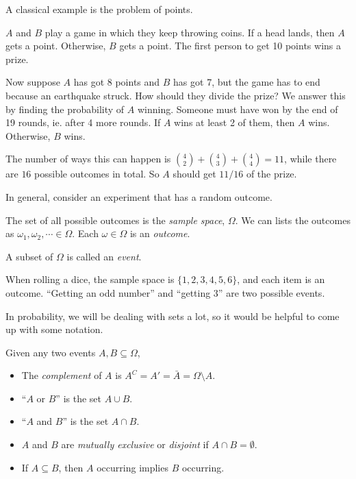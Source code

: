 \documentclass[a4paper]{article}
\begin{document}
A classical example is the problem of points.

\begin{eg}
  $A$ and $B$ play a game in which they keep throwing coins. If a head lands, then $A$ gets a point. Otherwise, $B$ gets a point. The first person to get 10 points wins a prize.

  Now suppose $A$ has got 8 points and $B$ has got 7, but the game has to end because an earthquake struck. How should they divide the prize? We answer this by finding the probability of $A$ winning. Someone must have won by the end of 19 rounds, ie. after 4 more rounds. If $A$ wins at least 2 of them, then $A$ wins. Otherwise, $B$ wins.

  The number of ways this can happen is $\binom{4}{2} + \binom{4}{3} + \binom{4}{4} = 11$, while there are $16$ possible outcomes in total. So $A$ should get $11/16$ of the prize.
\end{eg}

In general, consider an experiment that has a random outcome.

\begin{defi}
  The set of all possible outcomes is the \emph{sample space}, $\Omega$. We can lists the outcomes as $\omega_1, \omega_2, \cdots \in \Omega$. Each $\omega \in \Omega$ is an \emph{outcome}.
\end{defi}

\begin{defi}[Event]
  A subset of $\Omega$ is called an \emph{event}.
\end{defi}

\begin{eg}
  When rolling a dice, the sample space is $\{1, 2, 3, 4, 5, 6\}$, and each item is an outcome. ``Getting an odd number'' and ``getting 3'' are two possible events.
\end{eg}

In probability, we will be dealing with sets a lot, so it would be helpful to come up with some notation.
\begin{defi}
  Given any two events $A, B\subseteq \Omega$,
  \begin{itemize}
    \item The \emph{complement} of $A$ is $A^C = A' = \bar A = \Omega\setminus A$.
    \item ``$A$ or $B$'' is the set $A\cup B$.
    \item ``$A$ and $B$''  is the set $A\cap B$.
    \item $A$ and $B$ are \emph{mutually exclusive} or \emph{disjoint} if $A\cap B = \emptyset$.
    \item If $A\subseteq B$, then $A$ occurring implies $B$ occurring.
  \end{itemize}
\end{defi}
\end{document}
